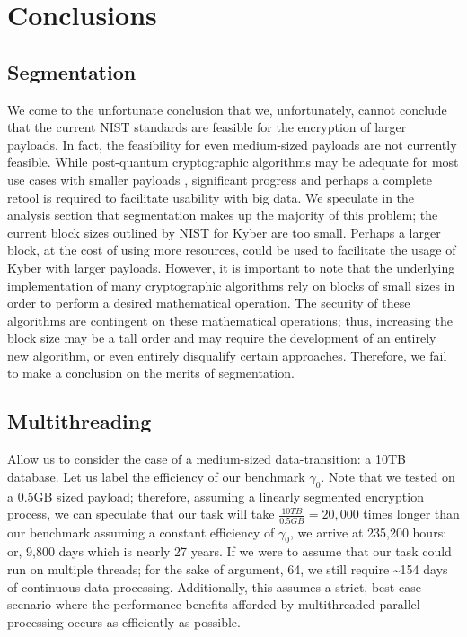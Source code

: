 \documentclass[a4paper]{article}
\begin{document}
\section{Conclusions}\label{conclusions}

\subsection{Segmentation}\label{segmentation}

We come to the unfortunate conclusion that we, unfortunately, cannot
conclude that the current NIST standards are feasible for the encryption
of larger payloads. In fact, the feasibility for even medium-sized
payloads are not currently feasible. While post-quantum cryptographic
algorithms may be adequate for most use cases with smaller payloads ,
significant progress and perhaps a complete retool is required to
facilitate usability with big data. We speculate in the analysis section
that segmentation makes up the majority of this problem; the current
block sizes outlined by NIST for Kyber are too small. Perhaps a larger
block, at the cost of using more resources, could be used to facilitate
the usage of Kyber with larger payloads. However, it is important to
note that the underlying implementation of many cryptographic algorithms
rely on blocks of small sizes in order to perform a desired mathematical
operation. The security of these algorithms are contingent on these
mathematical operations; thus, increasing the block size may be a tall
order and may require the development of an entirely new algorithm, or
even entirely disqualify certain approaches. Therefore, we fail to make
a conclusion on the merits of segmentation.

\subsection{Multithreading}\label{multithreading}

Allow us to consider the case of a medium-sized data-transition: a 10TB
database. Let us label the efficiency of our benchmark \(\gamma_0\).
Note that we tested on a 0.5GB sized payload; therefore, assuming a
linearly segmented encryption process, we can speculate that our task
will take \(\frac{10TB}{0.5GB} = 20,000\) times longer than our
benchmark assuming a constant efficiency of \(\gamma_0\), we arrive at
235,200 hours: or, 9,800 days which is nearly 27 years. If we were to
assume that our task could run on multiple threads; for the sake of
argument, 64, we still require \textasciitilde154 days of continuous
data processing. Additionally, this assumes a strict, best-case scenario
where the performance benefits afforded by multithreaded
parallel-processing occurs as efficiently as possible.
\end{document}
